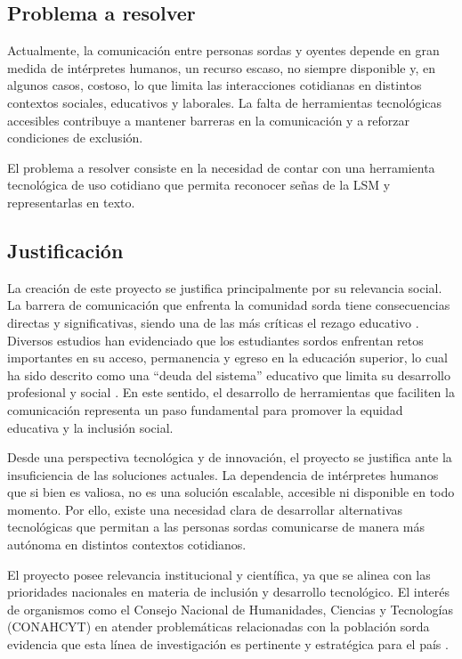 	
	\subsection{Problema a resolver}
	
	Actualmente, la comunicación entre personas sordas y oyentes depende en gran medida de intérpretes humanos, un recurso escaso, no siempre disponible y, en algunos casos, costoso, lo que limita las interacciones cotidianas en distintos contextos sociales, educativos y laborales. La falta de herramientas tecnológicas accesibles contribuye a mantener barreras en la comunicación y a reforzar condiciones de exclusión.
	
	El problema a resolver consiste en la necesidad de contar con una herramienta tecnológica de uso cotidiano que permita reconocer señas de la LSM y representarlas en texto.
	
	\subsection{Justificación}
	
	La creación de este proyecto se justifica principalmente por su relevancia social. La barrera de comunicación que enfrenta la comunidad sorda tiene consecuencias directas y significativas, siendo una de las más críticas el rezago educativo \cite{vazquez2023}. Diversos estudios han evidenciado que los estudiantes sordos enfrentan retos importantes en su acceso, permanencia y egreso en la educación superior, lo cual ha sido descrito como una ``deuda del sistema'' educativo que limita su desarrollo profesional y social \cite{delabarra2021, cruz2020}. En este sentido, el desarrollo de herramientas que faciliten la comunicación representa un paso fundamental para promover la equidad educativa y la inclusión social.
	
	Desde una perspectiva tecnológica y de innovación, el proyecto se justifica ante la insuficiencia de las soluciones actuales. La dependencia de intérpretes humanos que si bien es valiosa, no es una solución escalable, accesible ni disponible en todo momento. Por ello, existe una necesidad clara de desarrollar alternativas tecnológicas que permitan a las personas sordas comunicarse de manera más autónoma en distintos contextos cotidianos.
	
	El proyecto posee relevancia institucional y científica, ya que se alinea con las prioridades nacionales en materia de inclusión y desarrollo tecnológico. El interés de organismos como el Consejo Nacional de Humanidades, Ciencias y Tecnologías (CONAHCYT) en atender problemáticas relacionadas con la población sorda evidencia que esta línea de investigación es pertinente y estratégica para el país \cite{conahcyt2024}.
	
